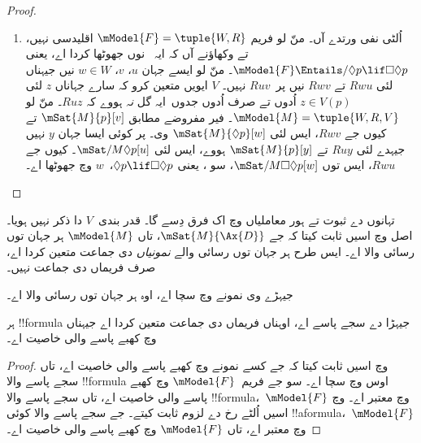\documentclass[../../../include/open-logic-section]{subfiles}
\begin{document}
\begin{proof}
\begin{enumerate}
    $V$ دی تعریف مطابق $\mSat{M}{p}[z]$ ہر اوس $z$ لئی جیہدے لئی $Ruz$، تے ایس لئی $\mSat{M}{\Box p}[u]$۔ پر مفروضے مطابق ، یعنی $\Box p
    \lif \Box \Box p$، $u$ وچ سچا اے، ایس لئی $\mSat{M}{\Box \Box
      p}[u]$۔ کیوں جے $Ruv$ تے $Rvw$، ایس لئی $\mSat{M}{p}[w]$، پر~$V$ دی تعریف مطابق ایہ صرف اُدوں ہو سکدا اے جدوں $Ruw$ ہووے، جیویں وکھاؤنا سی۔
  \item اُلٹی نفی ورتدے آں۔ منّ لو فریم
    $\mModel{F} = \tuple{W, R}$ اقلیدسی نہیں، تے وکھاؤنے آں کہ ایہ~ نوں جھوٹھا کردا اے، یعنی $\mModel{F} \Entails/ \Diamond p \lif
      \Box\Diamond p$۔ منّ لو ایسے جہان $u$، $v$، $w \in W$ نیں جیہناں لئی $Rwu$ تے $Rwv$ نیں پر~$Ruv$ نہیں۔ $V$ ایویں متعین کرو کہ سارے جہاناں $z$ لئی $z \in V(p)$ اُدوں تے صرف اُدوں جدوں~ایہ گل \emph{نہ} ہووے کہ $Ruz$۔ منّ لو $\mModel{M} =\tuple{W, R, V}$۔ فیر مفروضے مطابق $\mSat{M}{p}[v]$ تے کیوں جے $Rwv$، ایس لئی
    $\mSat{M}{\Diamond p}[w]$ وی۔ پر کوئی ایسا جہان $y$ نہیں جیہدے لئی $Ruy$ تے $\mSat{M}{p}[y]$ ہووے، ایس لئی $\mSat/{M}{\Diamond
      p}[u]$۔ کیوں جے $Rwu$، ایس توں $\mSat/{M}{\Box\Diamond
      p}[w]$، سو ، یعنی $\Diamond p \lif \Box\Diamond p$،~$w$ وچ جھوٹھا اے۔
  \end{enumerate}
\end{proof}

تہانوں  دے ثبوت تے ہور معاملیاں وچ اک فرق دِسے گا۔ قدر بندی~$V$ دا ذکر نہیں ہویا۔ اصل وچ اسیں ثابت کیتا کہ جے $\mSat{M}{\Ax{D}}$، تاں $\mModel{M}$ ہر جہان توں رسائی والا اے۔ ایس طرح  ہر جہان توں رسائی والے \emph{نمونیاں} دی جماعت متعین کردا اے، صرف فریماں دی جماعت نہیں۔

\begin{cor}
  جیہڑے وی نمونے وچ  سچا اے، اوہ ہر جہان توں رسائی والا اے۔
\end{cor}

\begin{cor}
ہر !!{formula} جیہڑا  دے سجے پاسے اے، اوہناں فریماں دی جماعت متعین کردا اے جیہناں وچ کھبے پاسے والی خاصیت اے۔
\end{cor}

\begin{proof}
   وچ اسیں ثابت کیتا کہ جے کسے نمونے وچ کھبے پاسے والی خاصیت اے، تاں سجے پاسے والا !!{formula} اوس وچ سچا اے۔ سو جے فریم~$\mModel{F}$ وچ کھبے پاسے والی خاصیت اے، تاں سجے پاسے والا !!{formula}،~$\mModel{F}$ وچ معتبر اے۔
   وچ اسیں اُلٹے رخ دے لزوم ثابت کیتے۔ جے سجے پاسے والا کوئی !!a{formula}،~$\mModel{F}$ وچ معتبر اے، تاں $\mModel{F}$ وچ کھبے پاسے والی خاصیت اے۔
\end{proof}
\end{document}
